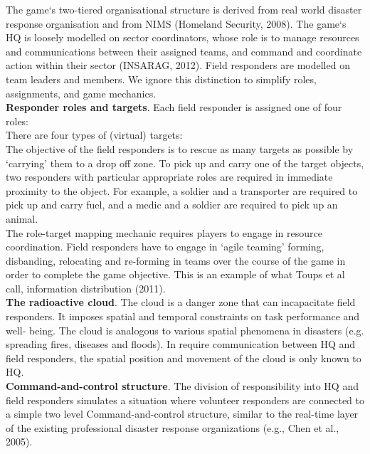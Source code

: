 The game`s two-tiered organisational structure is derived from real world disaster response organisation and from NIMS (Homeland Security, 2008). The game`s HQ is loosely modelled on sector coordinators, whose role is to manage resources and communications between their assigned teams, and command and coordinate action within their sector (INSARAG, 2012). Field responders are modelled on team leaders and members. We ignore this distinction to simplify roles, assignments, and game mechanics.\\

\textbf{Responder roles and targets}. Each field responder is assigned one of four roles:\\

There are four types of (virtual) targets:\\

The objective of the field responders is to rescue as many targets as possible by `carrying' them to a drop off zone. To pick up and carry one of the target objects, two responders with particular appropriate roles are required in immediate proximity to the object. For example, a soldier and a transporter are required to pick up and carry fuel, and a medic and a soldier are required to pick up an animal.\\

The role-target mapping mechanic requires players to engage in resource coordination. Field responders have to engage in `agile teaming' forming, disbanding, relocating and re-forming in teams over the course of the game in order to complete the game objective. This is an example of what Toups et al call, information distribution (2011).\\

\textbf{The radioactive cloud}. The cloud is a danger zone that can incapacitate field responders. It imposes spatial and temporal constraints on task performance and well- being. The cloud is analogous to various spatial phenomena in disasters (e.g. spreading fires, diseases and floods). In require communication between HQ and field responders, the spatial position and movement of the cloud is only known to HQ. \\

\textbf{Command-and-control structure}. The division of responsibility into HQ and field responders simulates a situation where volunteer responders are connected to a simple two level Command-and-control structure, similar to the real-time layer of the existing professional disaster response organizations (e.g., Chen et al., 2005).\\

